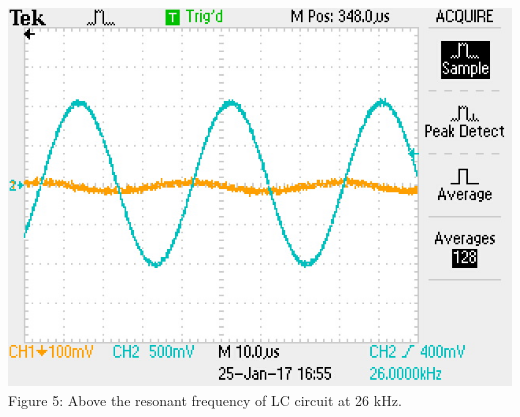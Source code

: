 \documentclass[]{article}
\begin{document}
\begin{center}
	\includegraphics[scale=0.8]{b_26Hz}\\
	Figure 5: Above the resonant frequency of LC circuit at 26 kHz.
\end{center}
\end{document}
